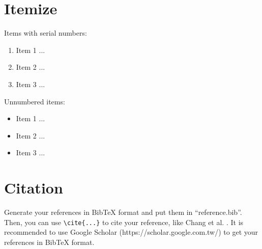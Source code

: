 \newpage
\section{Itemize}
Items with serial numbers:
\begin{enumerate}
    \item Item 1 ...
    \item Item 2 ...
    \item Item 3 ...
\end{enumerate}
Unnumbered items:
\begin{itemize}
    \item Item 1 ...
    \item Item 2 ...
    \item Item 3 ...
\end{itemize}

\section{Citation}
Generate your references in BibTeX format and put them in ``reference.bib''. Then, you can use \verb|\cite{...}| to cite your reference, like Chang et al. \cite{chang2010nthu}. It is recommended to use Google Scholar (https://scholar.google.com.tw/) to get your references in BibTeX format.

